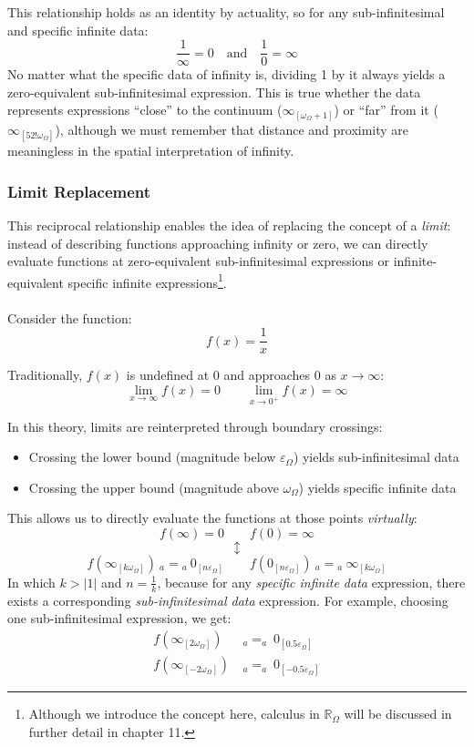 \documentclass{article}
\begin{document}
This relationship holds as an identity by actuality, so for any sub-infinitesimal and specific infinite data:
$$\frac{1}{\infty} = 0 \quad\text{and} \quad \frac{1}{0}=\infty$$No matter what the specific data of infinity is, dividing 1 by it always yields a zero-equivalent sub-infinitesimal expression. This is true whether the data represents expressions ``close'' to the continuum ($\infty_{[\omega_\Omega + 1]}$) or ``far'' from it ($\infty_{[52!\omega_\Omega]}$), although we must remember that distance and proximity are meaningless in the spatial interpretation of infinity.

\subsubsection{Limit Replacement}

This reciprocal relationship enables the idea of replacing the concept of a \textit{limit}: instead of describing functions approaching infinity or zero, we can directly evaluate functions at zero-equivalent sub-infinitesimal expressions or infinite-equivalent specific infinite expressions\footnote{Although we introduce the concept here, calculus in $\mathbb{R}_\Omega$ will be discussed in further detail in chapter 11.}.
\\\\Consider the function:
$$f(x) = \frac{1}{x}$$

Traditionally, $f(x)$ is undefined at 0 and approaches 0 as $x \to \infty$:
$$\lim_{x \to \infty} f(x) = 0 \qquad \lim_{x \to 0^+} f(x) = \infty$$

In this theory, limits are reinterpreted through boundary crossings:
\begin{itemize}
\item Crossing the lower bound (magnitude below $\varepsilon_\Omega$) yields sub-infinitesimal data
\item Crossing the upper bound (magnitude above $\omega_\Omega$) yields specific infinite data
\end{itemize}

This allows us to directly evaluate the functions at those points \textit{virtually}:
$$f(\infty) = 0 \qquad f(0) = \infty$$
$$\updownarrow$$
$$f(\infty_{[k\omega_\Omega]}) \ _a{=}{}_a \ 0_{[n\varepsilon_\Omega]} \qquad f(0_{[n\varepsilon_\Omega]}) \ _a{=}{}_a \ \infty_{[k\omega_\Omega]}$$
In which $k>|1|$ and $n=\frac{1}{k}$, because for any \textit{specific infinite data} expression, there exists a corresponding \textit{sub-infinitesimal data} expression.
For example, choosing one sub-infinitesimal expression, we get:
\begin{align*}
f(\infty_{[2\omega_\Omega]}) &\ {}_a{=}_a \ 0_{[0.5\varepsilon_\Omega]} \\
f(\infty_{[-2\omega_\Omega]}) &\ {}_a{=}_a \ 0_{[-0.5\varepsilon_\Omega]}
\end{align*}
\end{document}
